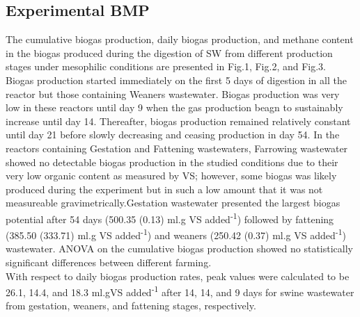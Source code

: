 \subsection{Experimental BMP}
The cumulative biogas production, daily biogas production, and methane content in the biogas produced during the digestion of SW from different production stages under mesophilic conditions are presented in Fig.1, Fig.2, and Fig.3.\\
Biogas production started immediately on the first 5 days of digestion in all the reactor but those containing Weaners wastewater. Biogas production was very low in these reactors until day 9 when the gas production beagn to sustainably increase until day 14. Thereafter, biogas production remained relatively constant until day 21 before slowly decreasing and ceasing production in day 54. In the reactors containing Gestation and Fattening wastewaters,
Farrowing wastewater showed no detectable biogas production in the studied conditions due to their very low organic content as measured by VS; however, some biogas was likely produced during the experiment but in such a low amount that it was not measureable gravimetrically.Gestation wastewater presented the largest biogas potential after 54 days (500.35 (0.13) ml.g VS added\textsuperscript{-1}) followed by fattening (385.50 (333.71) ml.g VS added\textsuperscript{-1}) and weaners (250.42 (0.37) ml.g VS added\textsuperscript{-1}) wastewater.   ANOVA on the cumulative biogas production showed no statistically significant differences between different farming.\\
With respect to daily biogas production rates, peak values were calculated to be 26.1, 14.4, and 18.3 ml.gVS added\textsuperscript{-1} after 14, 14, and 9 days for swine wastewater from gestation, weaners, and fattening stages, respectively.